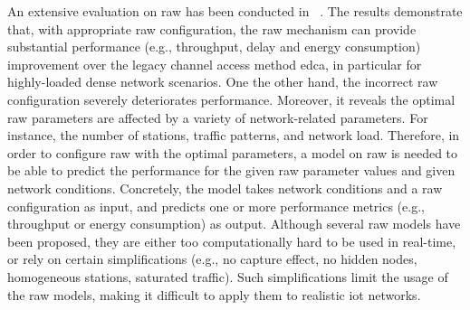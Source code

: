 

An extensive evaluation on \gls{raw} has been conducted in ~\cite{WoWMoM2016}. The results demonstrate that, with appropriate \gls{raw} configuration, the \gls{raw} mechanism can provide substantial performance (e.g., throughput, delay and energy consumption) improvement over the legacy channel access method \gls{edca}, in particular for highly-loaded dense network scenarios. One the other hand, the incorrect \gls{raw} configuration severely deteriorates performance. Moreover, it reveals the optimal \gls{raw} parameters are affected by a variety of network-related parameters. For instance, the number of stations, traffic patterns, and network load. Therefore, in order to configure \gls{raw} with the optimal parameters, a model on \gls{raw} is needed to be able to predict the performance for the given \gls{raw} parameter values and given network conditions. Concretely, the model takes network conditions and a \gls{raw} configuration as input, and predicts one or more performance metrics (e.g., throughput or energy consumption) as output. Although several \gls{raw} models have been proposed, they are either too computationally hard to be used in real-time, or rely on certain simplifications (e.g., no capture effect, no hidden nodes, homogeneous stations, saturated traffic). Such simplifications limit the usage of the \gls{raw} models, making it difficult to apply them to realistic \gls{iot} networks.

